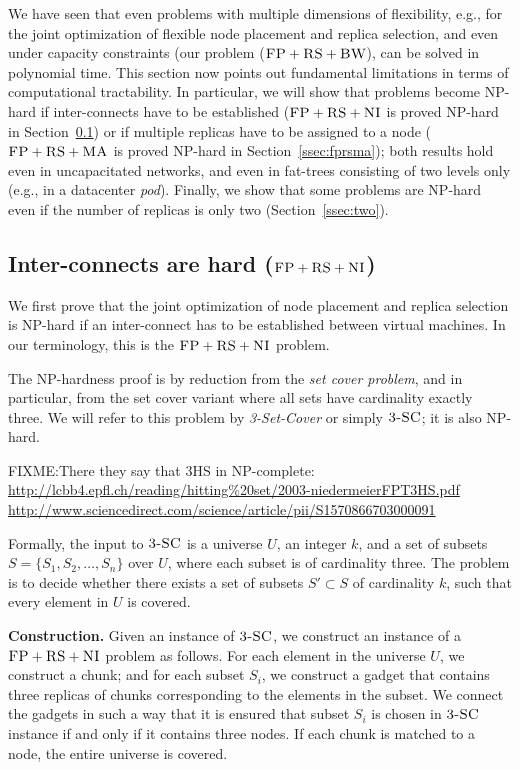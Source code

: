 We have seen that even problems with multiple dimensions of
flexibility, e.g., for the joint optimization of 
flexible node placement 
and replica selection, and even under capacity constraints (our problem
($\textsc{FP}+\textsc{RS}+\textsc{BW}$), can be solved in polynomial time.
This section now points out fundamental
limitations in terms of computational tractability. In particular,
we will show that problems become NP-hard if
inter-connects have to be established ($\textsc{FP}+\textsc{RS}+\textsc{NI}$ is proved
NP-hard in Section~\ref{ssec:fprscc}) or if multiple replicas
have to be assigned to a node ($\textsc{FP}+\textsc{RS}+\textsc{MA}$ is proved
NP-hard in Section~\ref{ssec:fprsma}); both results hold
even in uncapacitated networks, and even in fat-trees consisting
of two levels only (e.g., in a datacenter \emph{pod}). Finally, we show that
some problems are NP-hard even if the number of replicas is only two
(Section~\ref{ssec:two}).

\subsection{Inter-connects are hard ($\textsc{FP}+\textsc{RS}+\textsc{NI}$)}\label{ssec:fprscc}

We first prove that the joint optimization of node placement and replica selection
is NP-hard if an inter-connect has to be established between virtual machines.
In our terminology, this is the  $\textsc{FP}+\textsc{RS}+\textsc{NI}$ problem.

The NP-hardness proof is by reduction from the \emph{set cover problem},
and in particular, from the set cover variant where all 
sets have cardinality exactly three. We will
refer to this problem by \emph{3-Set-Cover} or simply $\textsc{3-SC}$;
it is also NP-hard.

FIXME:There they say that 3HS in NP-complete:
\url{http://lcbb4.epfl.ch/reading/hitting\%20set/2003-niedermeierFPT3HS.pdf}
\url{http://www.sciencedirect.com/science/article/pii/S1570866703000091}

Formally, the input to $\textsc{3-SC}$ is a universe $U$, an integer $k$,
and a set of subsets
$S = \{ S_1, S_2, \ldots, S_n \}$ over $U$, where each subset is of 
cardinality three. The problem is to decide whether there
exists a set of subsets $S' \subset S$ of cardinality $k$, such that
every element in $U$ is covered.

\textbf{Construction.}
Given an instance of $\textsc{3-SC}$, we construct an instance of a
$\textsc{FP}+\textsc{RS}+\textsc{NI}$ problem as follows. For each element
in the universe $U$, we construct a chunk; and for each 
subset $S_i$, we construct a gadget that contains
three replicas of chunks corresponding to the elements in the subset. 
We connect the gadgets in such a way that it is ensured
that subset $S_i$ is
chosen in $\textsc{3-SC}$ instance if and only if it contains three nodes. 
If each chunk is matched to a node, the entire universe
is covered. 


